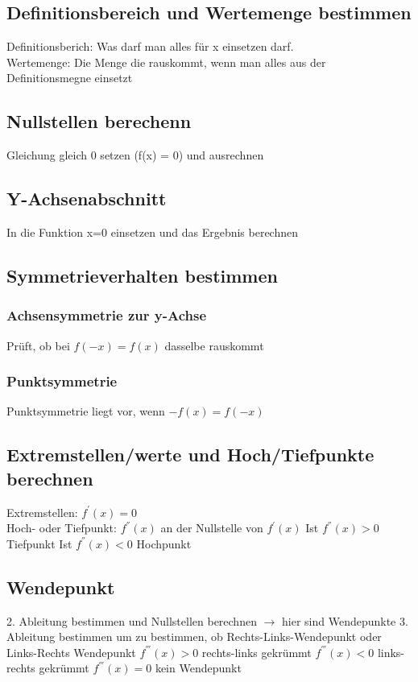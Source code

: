 \documentclass[12pt,a4paper]{article}
\begin{document}
			

	\subsection{Definitionsbereich und Wertemenge bestimmen}
		Definitionsberich: Was darf man alles für x einsetzen darf. \\
		Wertemenge: Die Menge die rauskommt, wenn man alles aus der Definitionsmegne einsetzt

	\subsection{Nullstellen berechenn}
		Gleichung gleich 0 setzen (f(x) = 0) und ausrechnen

	\subsection{Y-Achsenabschnitt}
		In die Funktion x=0 einsetzen und das Ergebnis berechnen

	\subsection{Symmetrieverhalten bestimmen}
		\subsubsection{Achsensymmetrie zur y-Achse}
			Prüft, ob bei $f(-x)=f(x)$ dasselbe rauskommt
		\subsubsection{Punktsymmetrie}
			Punktsymmetrie liegt vor, wenn $-f(x)=f(-x)$

	\subsection{Extremstellen/werte und Hoch/Tiefpunkte berechnen}
		Extremstellen: $f^{'}(x) = 0$\\
		Hoch- oder Tiefpunkt: $f^{''}(x)$ an der Nullstelle von $f^{'}(x)$ 
			Ist $f^{''}(x)>0$ Tiefpunkt
			Ist $f^{''}(x)<0$ Hochpunkt

	\subsection{Wendepunkt}
		2. Ableitung bestimmen und Nullstellen berechnen $\rightarrow$ hier sind Wendepunkte
		3. Ableitung bestimmen um zu bestimmen, ob Rechts-Links-Wendepunkt oder Links-Rechts Wendepunkt 
			$f^{'''}(x)>0$ rechts-links gekrümmt 
			$f^{'''}(x)<0$ links-rechts gekrümmt
			$f^{'''}(x)=0$ kein Wendepunkt
\end{document}
